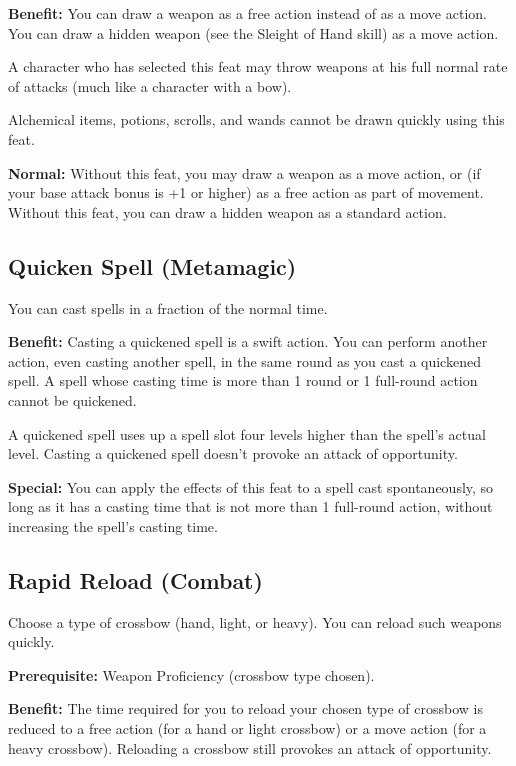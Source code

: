 \textbf{Benefit:} You can draw a weapon as a free action instead of as a move action. You can draw a hidden weapon (see the Sleight of Hand skill) as a move action.

A character who has selected this feat may throw weapons at his full normal rate of attacks (much like a character with a bow).

Alchemical items, potions, scrolls, and wands cannot be drawn quickly using this feat.
				
\textbf{Normal:} Without this feat, you may draw a weapon as a move action, or (if your base attack bonus is +1 or higher) as a free action as part of movement. Without this feat, you can draw a hidden weapon as a standard action.
				
\subsection{Quicken Spell (Metamagic)}

				
You can cast spells in a fraction of the normal time.
				
\textbf{Benefit:} Casting a quickened spell is a swift action. You can perform another action, even casting another spell, in the same round as you cast a quickened spell. A spell whose casting time is more than 1 round or 1 full-round action cannot be quickened.

A quickened spell uses up a spell slot four levels higher than the spell's actual level. Casting a quickened spell doesn't provoke an attack of opportunity.
				
\textbf{Special:} You can apply the effects of this feat to a spell cast spontaneously, so long as it has a casting time that is not more than 1 full-round action, without increasing the spell's casting time.
				
\subsection{Rapid Reload (Combat)}

				
Choose a type of crossbow (hand, light, or heavy). You can reload such weapons quickly.
				
\textbf{Prerequisite:} Weapon Proficiency (crossbow type chosen).
				
\textbf{Benefit:} The time required for you to reload your chosen type of crossbow is reduced to a free action (for a hand or light crossbow) or a move action (for a heavy crossbow). Reloading a crossbow still provokes an attack of opportunity.

